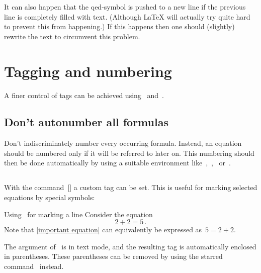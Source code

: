 It can also happen that the qed-symbol is pushed to a new line if the previous line is completely filled with text.
(Although {\LaTeX} will actually try quite hard to prevent this from happening.)
If this happens then one should (slightly) rewrite the text to circumvent this problem.





\section{Tagging and numbering}

A finer control of tags can be achieved using~ and~.



\subsection{Don’t autonumber all formulas}
\label{dont number all formulas}

Don’t indiscriminately number every occurring formula.
Instead, an equation should be numbered only if it will be referred to later on.
This numbering should then be done automatically by using a suitable environment like~,~,~ or~.



\subsection{}

With the command~[\comname] a custom tag can be set.
This is useful for marking selected equations by special symbols:
\begin{showlatex}{Using~ for marking a line}
Consider the equation
\begin{equation}
\label{important equation}
  2 + 2 = 5 \,.
  \tag{\ast}
\end{equation}
Note that \cref{important equation} can equivalently be expressed as~$5 = 2 + 2$.
\end{showlatex}
The argument of~ is in text mode, and the resulting tag is automatically enclosed in parentheses.
These parentheses can be removed by using the starred command~ instead.

